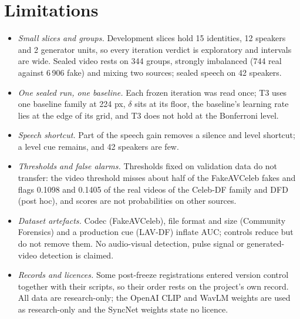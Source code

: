 \documentclass[conference,a4paper]{IEEEtran_nodash}
\begin{document}
\section{Limitations}\label{sec:discussion}
\begin{itemize}
  \item \emph{Small slices and groups.} Development slices hold 15 identities, 12
        speakers and 2 generator units, so every iteration verdict is exploratory
        and intervals are wide. Sealed video rests on 344 groups, strongly
        imbalanced (744 real against 6\,906 fake) and mixing two sources; sealed
        speech on 42 speakers.
  \item \emph{One sealed run, one baseline.} Each frozen iteration was read once; T3
        uses one baseline family at 224 px, $\delta$ sits at its floor, the
        baseline's learning rate lies at the edge of its grid, and T3 does not hold
        at the Bonferroni level.
  \item \emph{Speech shortcut.} Part of the speech gain removes a silence and level
        shortcut; a level cue remains, and 42 speakers are few.
  \item \emph{Thresholds and false alarms.} Thresholds fixed on validation data do
        not transfer: the video threshold misses about half of the FakeAVCeleb fakes
        and flags 0.1098 and 0.1405 of the real videos of the Celeb-DF family and
        DFD (post hoc), and scores are not probabilities on other sources.
  \item \emph{Dataset artefacts.} Codec (FakeAVCeleb), file format and size
        (Community Forensics) and a production cue (LAV-DF) inflate AUC; controls
        reduce but do not remove them. No audio-visual detection, pulse signal or
        generated-video detection is claimed.
  \item \emph{Records and licences.} Some post-freeze registrations entered version
        control together with their scripts, so their order rests on the project's
        own record. All data are research-only; the OpenAI CLIP and WavLM weights
        are used as research-only and the SyncNet weights state no licence.
\end{itemize}

\end{document}
